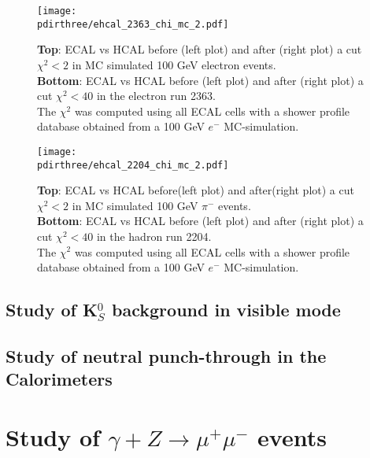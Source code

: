 \begin{figure}[h!]
  \begin{center}
    \texttt{[image: \\pdirthree/ehcal\_2363\_chi\_mc\_2.pdf]}
  \end{center}
  \caption{\textbf{Top}: ECAL vs HCAL before (left plot) and
    after (right plot) a cut
    $\chi^2<2$ in MC simulated 100 GeV electron events. \\
    \textbf{Bottom}: ECAL vs HCAL before (left plot) and after (right
    plot) a cut
    $\chi^2<40$ in the electron run 2363.\\
    The $\chi^2$ was computed using all ECAL cells with a shower
    profile database obtained from a 100 GeV $e^-$ MC-simulation. }
  \label{fig:ehcal_elec}
\end{figure}

\begin{figure}[h!]
  \begin{center}
    \texttt{[image: \\pdirthree/ehcal\_2204\_chi\_mc\_2.pdf]}
  \end{center}
  \caption{\textbf{Top}: ECAL vs HCAL before(left plot) and
    after(right plot) a cut
    $\chi^2<2$ in MC simulated 100 GeV $\pi^-$ events. \\
    \textbf{Bottom}: ECAL vs HCAL before (left plot) and after (right
    plot) a cut
    $\chi^2<40$ in the hadron run 2204.\\
    The $\chi^2$ was computed using all ECAL cells with a shower
    profile database obtained from a 100 GeV $e^-$ MC-simulation. }
  \label{fig:ehcal_hadr}
\end{figure}

\clearpage
\newpage

\subsection{Study of K$^0_S$ background in visible mode}
\label{ch3:sec:bkg-k0s}

\subsection{Study of neutral punch-through in the Calorimeters}
\label{ch3:sec:bkg-neutrals}

\section{Study of $\gamma + Z \rightarrow \mu^+ \mu^-$ events }
\label{ch3:sec:dimuons}

